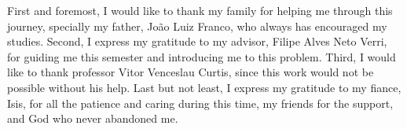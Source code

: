 \begin{agradecimentos}

First and foremost, I would like to thank my family for helping me through this journey, specially my father, João Luiz Franco, who always has encouraged my studies. Second, I express my gratitude to my advisor, Filipe Alves Neto Verri, for guiding me this semester and introducing me to this problem. Third, I would like to thank professor Vitor Venceslau Curtis, since this work would not be possible without his help. Last but not least, I express my gratitude to my fiance, Isis, for all the patience and caring during this time, my friends for the support, and God who never abandoned me.
	
\end{agradecimentos}

